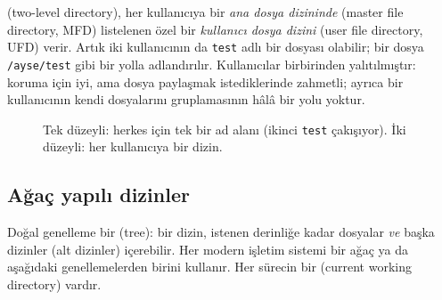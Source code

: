  (two-level directory), her kullanıcıya bir \emph{ana dosya dizininde} (master file directory, MFD) listelenen özel bir \emph{kullanıcı dosya dizini} (user file directory, UFD) verir. Artık iki kullanıcının da \texttt{test} adlı bir dosyası olabilir; bir dosya \texttt{/ayse/test} gibi bir yolla adlandırılır. Kullanıcılar birbirinden yalıtılmıştır: koruma için iyi, ama dosya paylaşmak istediklerinde zahmetli; ayrıca bir kullanıcının kendi dosyalarını gruplamasının hâlâ bir yolu yoktur.

\begin{figure}[H]
\centering
{}
\caption{Tek düzeyli: herkes için tek bir ad alanı (ikinci \texttt{test} çakışıyor). İki düzeyli: her kullanıcıya bir dizin.}
\end{figure}

\subsection{Ağaç yapılı dizinler}

Doğal genelleme bir  (tree): bir dizin, istenen derinliğe kadar dosyalar \emph{ve} başka dizinler (alt dizinler) içerebilir. Her modern işletim sistemi bir ağaç ya da aşağıdaki genellemelerden birini kullanır. Her sürecin bir  (current working directory) vardır.

